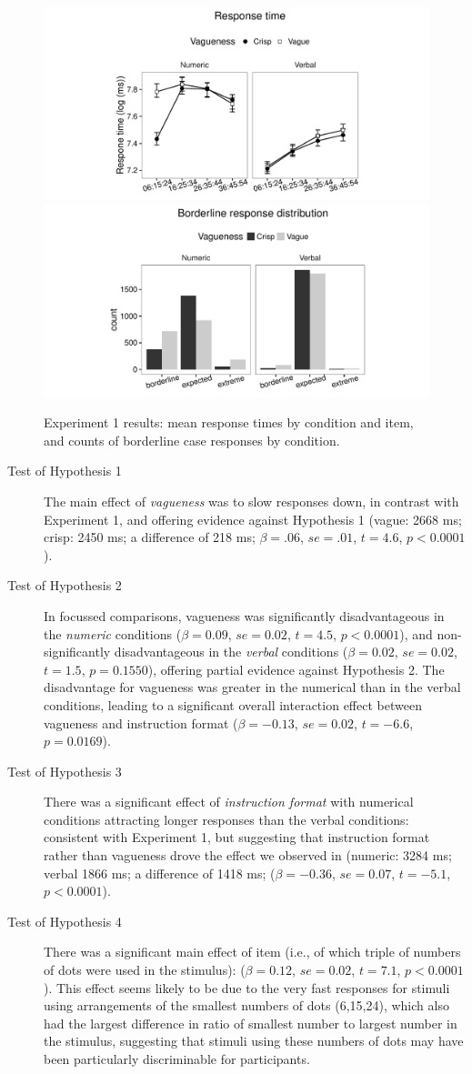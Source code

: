 \begin{figure}[htbp]
\centering
\includegraphics[trim = 20mm 0mm 30mm 0mm, clip, width=.49\textwidth]{figures/Ce1-rtplot-1.pdf}
\includegraphics[trim = 20mm 0mm 25mm 0mm, clip, width=.49\textwidth]{figures/Ce1-blBarChart-1}
\caption{Experiment 1 results: mean response times by condition and item, and counts of borderline case responses by condition.}
\label{resultsC-exp-1}
\end{figure}

\begin{description}
	\item [Test of Hypothesis 1] The main effect of \emph{vagueness} was to slow responses down, in contrast with Experiment 1, and offering evidence against Hypothesis 1 (vague: 2668 ms; crisp: 2450 ms; a difference of 218 ms; $\beta=.06$, $se=.01$, $t=4.6$, $p<0.0001$). 
	\item [Test of Hypothesis 2] In focussed comparisons, vagueness was significantly disadvantageous in the \emph{numeric} conditions ($\beta=0.09$, $se=0.02$, $t=4.5$, $p<0.0001$), and non-significantly disadvantageous in the \emph{verbal} conditions ($\beta=0.02$, $se=0.02$, $t=1.5$, $p=0.1550$), offering partial evidence against Hypothesis 2. The disadvantage for vagueness was greater in the numerical than in the verbal conditions, leading to a significant overall interaction effect between vagueness and instruction format ($\beta=-0.13$, $se=0.02$, $t=-6.6$, $p=0.0169$).
	\item [Test of Hypothesis 3] There was a significant effect of \emph{instruction format} with numerical conditions attracting longer responses than the verbal conditions: consistent with Experiment 1, but suggesting that instruction format rather than vagueness drove the effect we observed in \citet{green2013utility} (numeric: 3284 ms; verbal 1866 ms; a difference of 1418 ms; ($\beta=-0.36$, $se=0.07$, $t=-5.1$, $p<0.0001$).
	\item [Test of Hypothesis 4] There was a significant main effect of item (i.e., of which triple of numbers of dots were used in the stimulus): ($\beta=0.12$, $se=0.02$, $t=7.1$, $p<0.0001$). This effect seems likely to be due to the very fast responses for stimuli using arrangements of the smallest numbers of dots (6,15,24), which also had the largest difference in ratio of smallest number to largest number in the stimulus, suggesting that stimuli using these numbers of dots may have been particularly discriminable for participants.
\end{description}

